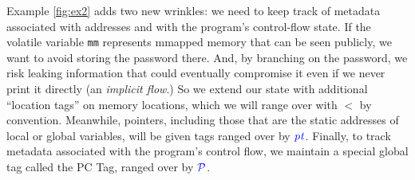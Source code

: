 \documentclass{llncs}
\begin{document}
Example \ref{fig:ex2} adds two new wrinkles: we need to keep track of metadata associated with
addresses and with the program's control-flow state. If the volatile variable {\tt mm} represents
mmapped memory that can be seen publicly, we want to avoid storing the password there. And, by
branching on the password, we risk leaking information that could eventually compromise it even
if we never print it directly (an {\em implicit flow}.) So we extend our state with additional
``location tags'' on memory locations, which we will range over with \(\lt\) by convention.
Meanwhile, pointers, including those that are the static addresses of local or global variables,
will be given tags ranged over by \(\mathit{\color{blue} pt}\). Finally, to track metadata associated with the program's
control flow, we maintain a special global tag called the PC Tag, ranged over by \(\mathcal{\color{blue} P}\).
\end{document}
